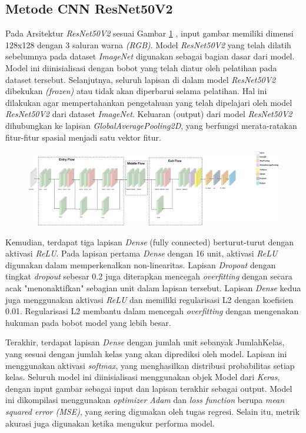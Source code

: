 \subsection{Metode CNN ResNet50V2}
Pada Arsitektur \textit{ResNet50V2} sesuai Gambar \ref{fig:textitResNet50V2} , input gambar memiliki dimensi 128x128 dengan 3 saluran warna \textit{(RGB)}. Model \textit{ResNet50V2} yang telah dilatih sebelumnya pada dataset \textit{ImageNet} digunakan sebagai bagian dasar dari model. Model ini diinisialisasi dengan bobot yang telah diatur oleh pelatihan pada dataset tersebut. Selanjutnya, seluruh lapisan di dalam model \textit{ResNet50V2} dibekukan \textit{(frozen)} atau tidak akan diperbarui selama pelatihan. Hal ini dilakukan agar mempertahankan pengetahuan yang telah dipelajari oleh model \textit{ResNet50V2} dari dataset \textit{ImageNet}. Keluaran (output) dari model \textit{ResNet50V2} dihubungkan ke lapisan \textit{GlobalAveragePooling2D}, yang berfungsi merata-ratakan fitur-fitur spasial menjadi satu vektor fitur.
\begin{figure}[hbt!]
	\includegraphics[width=1.1\linewidth]{gambar/bener/Arsitektur_ModelCNNResNet50v2_Modifikasi.png}
	\label{fig:textitResNet50V2}
\end{figure}
Kemudian, terdapat tiga lapisan \textit{Dense} (fully connected) berturut-turut dengan aktivasi \textit{ReLU}. Pada lapisan pertama \textit{Dense} dengan 16 unit, aktivasi \textit{ReLU} digunakan dalam memperkenalkan non-linearitas. Lapisan \textit{Dropout} dengan tingkat \textit{dropout} sebesar 0.2 juga diterapkan mencegah \textit{overfitting} dengan secara acak "menonaktifkan" sebagian unit dalam lapisan tersebut. Lapisan \textit{Dense} kedua juga menggunakan aktivasi \textit{ReLU} dan memiliki regularisasi L2 dengan koefisien 0.01. Regularisasi L2 membantu dalam mencegah \textit{overfitting} dengan mengenakan hukuman pada bobot model yang lebih besar.

Terakhir, terdapat lapisan \textit{Dense} dengan jumlah unit sebanyak JumlahKelas, yang sesuai dengan jumlah kelas yang akan diprediksi oleh model. Lapisan ini menggunakan aktivasi \textit{softmax}, yang menghasilkan distribusi probabilitas setiap kelas. Seluruh model ini diinisialisasi menggunakan objek Model dari \textit{Keras}, dengan input gambar sebagai input dan lapisan terakhir sebagai output. Model ini dikompilasi menggunakan \textit{optimizer Adam} dan \textit{loss function} berupa\textit{ mean squared error (MSE)}, yang sering digunakan oleh tugas regresi. Selain itu, metrik akurasi juga digunakan ketika mengukur performa model.

